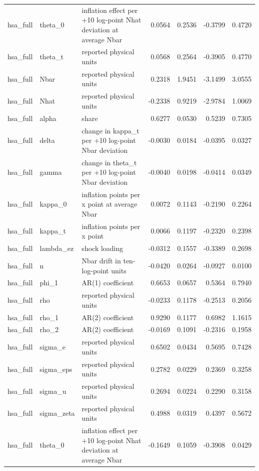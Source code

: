 \begin{tabular}{lllrrrr}
hsa\_full & theta\_0 & inflation effect per +10 log-point Nhat deviation at average Nbar & 0.0564 & 0.2536 & -0.3799 & 0.4720 \\
hsa\_full & theta\_t & reported physical units & 0.0568 & 0.2564 & -0.3905 & 0.4770 \\
hsa\_full & Nbar & reported physical units & 0.2318 & 1.9451 & -3.1499 & 3.0555 \\
hsa\_full & Nhat & reported physical units & -0.2338 & 0.9219 & -2.9784 & 1.0069 \\
hsa\_full & alpha & share & 0.6277 & 0.0530 & 0.5239 & 0.7305 \\
hsa\_full & delta & change in kappa\_t per +10 log-point Nbar deviation & -0.0030 & 0.0184 & -0.0395 & 0.0327 \\
hsa\_full & gamma & change in theta\_t per +10 log-point Nbar deviation & -0.0040 & 0.0198 & -0.0414 & 0.0349 \\
hsa\_full & kappa\_0 & inflation points per x point at average Nbar & 0.0072 & 0.1143 & -0.2190 & 0.2264 \\
hsa\_full & kappa\_t & inflation points per x point & 0.0066 & 0.1197 & -0.2320 & 0.2398 \\
hsa\_full & lambda\_ez & shock loading & -0.0312 & 0.1557 & -0.3389 & 0.2698 \\
hsa\_full & n & Nbar drift in ten-log-point units & -0.0420 & 0.0264 & -0.0927 & 0.0100 \\
hsa\_full & phi\_1 & AR(1) coefficient & 0.6653 & 0.0657 & 0.5364 & 0.7940 \\
hsa\_full & rho & reported physical units & -0.0233 & 0.1178 & -0.2513 & 0.2056 \\
hsa\_full & rho\_1 & AR(2) coefficient & 0.9290 & 0.1177 & 0.6982 & 1.1615 \\
hsa\_full & rho\_2 & AR(2) coefficient & -0.0169 & 0.1091 & -0.2316 & 0.1958 \\
hsa\_full & sigma\_e & reported physical units & 0.6502 & 0.0434 & 0.5695 & 0.7428 \\
hsa\_full & sigma\_eps & reported physical units & 0.2782 & 0.0229 & 0.2369 & 0.3258 \\
hsa\_full & sigma\_u & reported physical units & 0.2694 & 0.0224 & 0.2290 & 0.3158 \\
hsa\_full & sigma\_zeta & reported physical units & 0.4988 & 0.0319 & 0.4397 & 0.5672 \\
hsa\_full & theta\_0 & inflation effect per +10 log-point Nhat deviation at average Nbar & -0.1649 & 0.1059 & -0.3908 & 0.0429 \\

\end{tabular}

